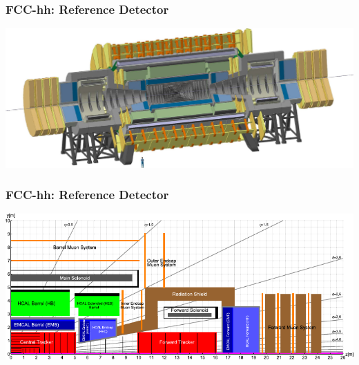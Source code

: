 \documentclass[aspectratio=169]{beamer}
\begin{document}
\begin{frame}
  \frametitle{FCC-hh: Reference Detector}

  \begin{adjustwidth}{-2em}{-2em}
    \includegraphics[width=\linewidth]{figures/FCC_hh_ref_detector.png}
  \end{adjustwidth}
\end{frame}

\begin{frame}
  \frametitle{FCC-hh: Reference Detector}

  \begin{adjustwidth}{-2em}{-2em}
    \includegraphics[width=\linewidth]{figures/FCC_hh_ref_detector_xsec.pdf}
  \end{adjustwidth}
\end{frame}
\end{document}
